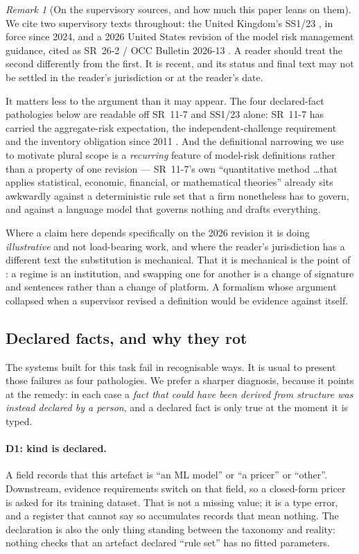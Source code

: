 \documentclass[11pt,a4paper]{article}
\renewcommand{\_}{\oldunderscore\allowbreak}
\theoremstyle{plain}
\theoremstyle{definition}
\theoremstyle{definition}
\theoremstyle{remark}
\newtheorem{remark}[theorem]{Remark}
\begin{document}
\begin{remark}[On the supervisory sources, and how much this paper leans on them]\label{rem:sources}
We cite two supervisory texts throughout: the United Kingdom's SS1/23 \cite{ss123}, in force since 2024,
and a 2026 United States revision of the model risk management guidance, cited as SR~26-2 / OCC Bulletin
2026-13 \cite{sr262}. A reader should treat the second differently from the first. It is recent, and its
status and final text may not be settled in the reader's jurisdiction or at the reader's date.

It matters less to the argument than it may appear. The four declared-fact pathologies below are readable
off SR~11-7 and SS1/23 alone: SR~11-7 has carried the aggregate-risk expectation, the
independent-challenge requirement and the inventory obligation since 2011 \cite{sr117}. And the
definitional narrowing we use to motivate plural scope is a \emph{recurring} feature of model-risk
definitions rather than a property of one revision --- SR~11-7's own ``quantitative method \ldots that
applies statistical, economic, financial, or mathematical theories'' already sits awkwardly against a
deterministic rule set that a firm nonetheless has to govern, and against a language model that governs
nothing and drafts everything.

Where a claim here depends specifically on the 2026 revision it is doing \emph{illustrative} and not
load-bearing work, and where the reader's jurisdiction has a different text the substitution is
mechanical. That it is mechanical is the point of : a regime is an institution, and
swapping one for another is a change of signature and sentences rather than a change of platform. A
formalism whose argument collapsed when a supervisor revised a definition would be evidence against
itself.
\end{remark}

\subsection{Declared facts, and why they rot}

The systems built for this task fail in recognisable ways. It is usual to present those failures as
four pathologies. We prefer a sharper diagnosis, because it points at the remedy: in each case a
\emph{fact that could have been derived from structure was instead declared by a person}, and a declared
fact is only true at the moment it is typed.

\paragraph{D1: kind is declared.} A field records that this artefact is ``an ML model'' or ``a pricer''
or ``other''. Downstream, evidence requirements switch on that field, so a closed-form pricer is asked
for its training dataset. That is not a missing value; it is a type error, and a register that cannot
say so accumulates records that mean nothing. The declaration is also the only thing standing between
the taxonomy and reality: nothing checks that an artefact declared ``rule set'' has no fitted
parameters.
\end{document}
